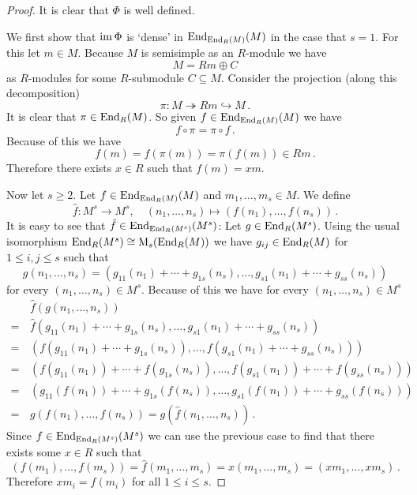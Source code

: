 \begin{proof}
  It is clear that $\Phi$ is well defined.
  
  We first show that $\operatorname{im} \Phi$ is `dense' in $\operatorname{End}_{\operatorname{End}_R(M)}(M)$ in the case that $s = 1$.
  For this let $m \in M$. Because $M$ is semisimple as an $R$-module we have
  \[
    M = Rm \oplus C
  \]
  as $R$-modules for some $R$-submodule $C \subseteq M$.
  Consider the projection (along this decomposition)
  \[
                        \pi
    \colon              M
    \twoheadrightarrow  Rm
    \hookrightarrow     M \,.
  \]
  It is clear that $\pi \in \operatorname{End}_R(M)$.
  So given $f \in \operatorname{End}_{\operatorname{End}_R(M)}(M)$ we have
  \[
      f \circ \pi
    = \pi \circ f \,.
  \]
  Because of this we have
  \[
        f(m)
    =   f(\pi(m))
    =   \pi(f(m))
    \in Rm \,.
  \]
  Therefore there exists $x \in R$ such that $f(m) = xm$.

  Now let $s \geq 2$. Let $f \in \operatorname{End}_{\operatorname{End}_R(M)}(M)$ and $m_1, \dotsc, m_s \in M$.
  We define
  \[
            \hat{f}
    \colon  M^s
    \to     M^s,
    \quad   (n_1, \dotsc, n_s)
    \mapsto (f(n_1), \dotsc, f(n_s)) \,.
  \]
  It is easy to see that $\hat{f} \in \operatorname{End}_{\operatorname{End}_R(M^s)}(M^s)$:
  Let $g \in \operatorname{End}_R(M^s)$.
  Using the usual isomorphism $\operatorname{End}_R(M^s) \cong \operatorname{M}_s(\operatorname{End}_R(M))$ we have $g_{ij} \in \operatorname{End}_R(M)$ for $1 \leq i,j \leq s$ such that
  \[
      g(n_1, \dotsc, n_s)
    = ( g_{11}(n_1) + \dotsb + g_{1s}(n_s),
        \dotsc,
        g_{s1}(n_1) + \dotsb + g_{ss}(n_s)  )
  \]
  for every $(n_1, \dotsc, n_s) \in M^s$.
  Because of this we have for every $(n_1, \dotsc, n_s) \in M^s$
  \begin{align*}
     &\,  \hat{f}( g(n_1, \dotsc, n_s) )  \\
    =&\,  \hat{f}( g_{11}(n_1) + \dotsb + g_{1s}(n_s),
                   \dotsc,
                   g_{s1}(n_1) + \dotsb + g_{ss}(n_s) ) \\
    =&\,  ( f(g_{11}(n_1) + \dotsb + g_{1s}(n_s)),
            \dotsc,
            f(g_{s1}(n_1) + \dotsb + g_{ss}(n_s)) ) \\
    =&\,  ( f(g_{11}(n_1)) + \dotsb + f(g_{1s}(n_s)),
            \dotsc,
            f(g_{s1}(n_1)) + \dotsb + f(g_{ss}(n_s))  ) \\
    =&\,  ( g_{11}(f(n_1)) + \dotsb + g_{1s}(f(n_s)),
            \dotsc,
            g_{s1}(f(n_1)) + \dotsb + g_{ss}(f(n_s))  ) \\
    =&\,  g( f(n_1), \dotsc, f(n_s) )
    =     g( \hat{f}(n_1, \dotsc, n_s )) \,.
  \end{align*}
  Since $f \in \operatorname{End}_{\operatorname{End}_R(M^s)}(M^s)$ we can use the previous case to find that there exists some $x \in R$ such that
  \[
    (f(m_1), \dotsc, f(m_s))
    = \hat{f}(m_1, \dotsc, m_s)
    = x (m_1, \dotsc, m_s)
    = (x m_1, \dotsc, x m_s) \,.
  \]
  Therefore $x m_i = f(m_i)$ for all $1 \leq i \leq s$.
\end{proof}


